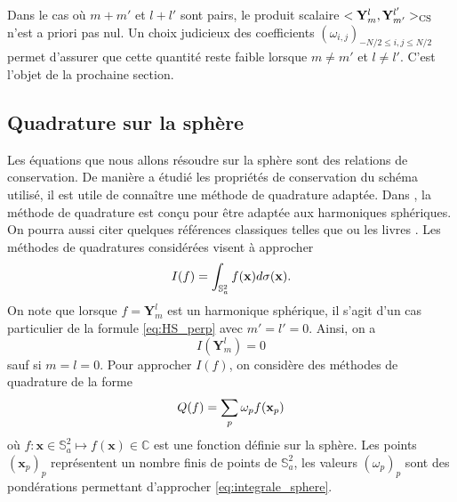 Dans le cas où $m+m'$ et $l+l'$ sont pairs, le produit scalaire $<\mathbf{Y}_m^l, \mathbf{Y}_{m'}^{l'}>_{\text{CS}}$ n'est a priori pas nul. Un choix judicieux des coefficients $(\omega_{i,j})_{-N/2 \leq i,j  \leq N/2}$ permet d'assurer que cette quantité reste faible lorsque $m \neq m'$ et $l \neq l'$. C'est l'objet de la prochaine section.








































\subsection{Quadrature sur la sphère}

Les équations que nous allons résoudre sur la sphère sont des relations de conservation. De manière a étudié les propriétés de conservation du schéma utilisé, il est utile de connaître une méthode de quadrature adaptée. Dans \cite{Ahrens2009, Fornberg2014}, la méthode de quadrature est conçu pour être adaptée aux harmoniques sphériques. On pourra aussi citer quelques références classiques telles que \cite{Mclaren1963} ou les livres \cite{Atkinson2012, Hesse2010}. Les méthodes de quadratures considérées visent à approcher
\begin{equation}
I(f) = \displaystyle\int_{\mathbb{S}_a^2} f(\mathbf{x}) d \sigma(\mathbf{x}).
\label{eq:integrale_sphere}
\end{equation}
On note que lorsque $f = \mathbf{Y}_m^l$ est un harmonique sphérique, il s'agit d'un cas particulier de la formule \eqref{eq:HS_perp} avec $m'=l'=0$. Ainsi, on a 
\begin{equation}
I(\mathbf{Y}_m^l) = 0
\end{equation}
sauf si $m=l=0$.
Pour approcher $I(f)$, on considère des méthodes de quadrature de la forme
\begin{equation}
Q(f) = \displaystyle\sum\limits_p \omega_p f(\mathbf{x}_p)
\label{eq:quadrature_sphere}
\end{equation}
où $f : \mathbf{x} \in \mathbb{S}_a^2 \mapsto f(\mathbf{x}) \in \mathbb{C}$ est une fonction définie sur la sphère. Les points $(\mathbf{x}_p)_p$ représentent un nombre finis de points de $\mathbb{S}_a^2$, les valeurs $(\omega_p)_p$ sont des pondérations permettant d'approcher \eqref{eq:integrale_sphere}.

